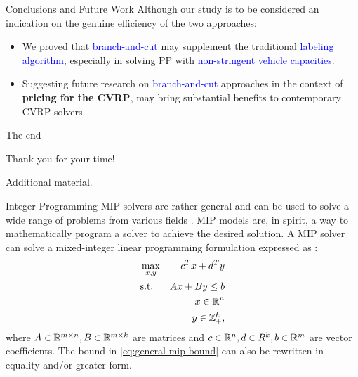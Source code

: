 \begin{frame}{Conclusions and Future Work}
	Although our study is to be considered an indication on the genuine efficiency of the two approaches:
	\begin{itemize}
		\item We proved that \textcolor{blue}{branch-and-cut} may supplement the traditional \textcolor{blue}{labeling algorithm},
		      especially in solving PP with \textcolor{blue}{non-stringent vehicle capacities}.
		\item Suggesting future research on \textcolor{blue}{branch-and-cut} approaches in the context of \textbf{pricing for the CVRP},
		      may bring substantial benefits to contemporary CVRP solvers.
	\end{itemize}
\end{frame}

\begin{frame}{The end}
	\begin{center}
		\begingroup
		\fontsize{18pt}{18pt}\selectfont
		Thank you for your time!
		\endgroup
	\end{center}
\end{frame}

\appendix

\begin{frame}
\end{frame}

\begin{frame}
	\begin{center}
		\begingroup
		\fontsize{18pt}{18pt}\selectfont
		Additional material.
		\endgroup
	\end{center}
\end{frame}

\begin{frame}{Integer Programming}
	MIP solvers are rather general and can be used to solve a wide range of problems from various fields \parencite{bixby2007progress}.
	MIP models are, in spirit, a way to mathematically program a solver to achieve the desired solution.
	A MIP solver can solve a mixed-integer linear programming formulation
	expressed as \parencite{wolsey1999integer}:
	\begin{align}
		 & \max_{x, y} & c^T x + d^T y                                 \\
		 & \text{s.t.} & A x + B y \le b  \label{eq:general-mip-bound} \\
		 &             & x \in \mathbb R^n                                    \\
		 &             & y \in \mathbb Z_{+}^k,
	\end{align}
	where $A \in \mathbb R^{m \times n}, B \in \mathbb R^{m \times k}$ are matrices and
	$c \in \mathbb R^n, d \in R^k, b \in \mathbb R^m$ are vector coefficients.
	The bound in \cref{eq:general-mip-bound} can also be rewritten in equality and/or greater form.
\end{frame}

